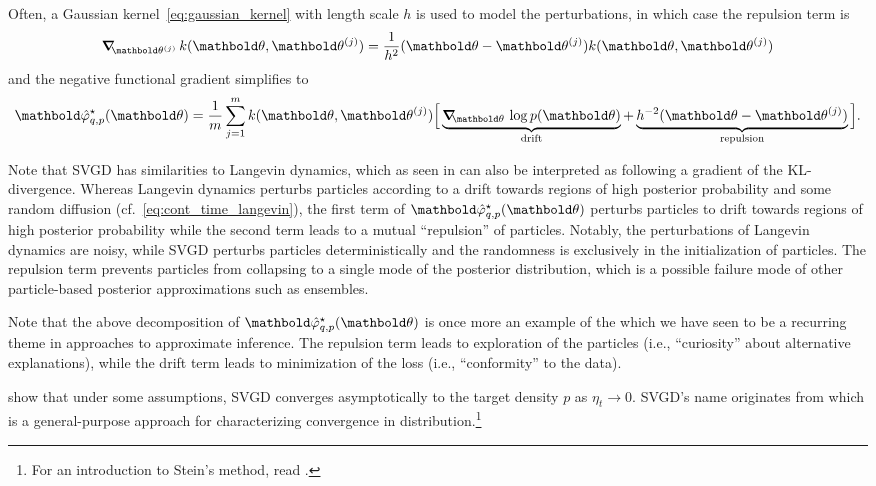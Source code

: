 Often, a Gaussian kernel~\eqref{eq:gaussian_kernel} with length scale $h$ is used to model the perturbations, in which case the repulsion term is \begin{align}
  \grad_{\vtheta^{(j)}} k(\vtheta,\vtheta^{(j)}) = \frac{1}{h^2} (\vtheta - \vtheta^{(j)}) k(\vtheta,\vtheta^{(j)})
\end{align} and the negative functional gradient simplifies to \begin{align}
  \opt{\vvarphihat_{q,p}}(\vtheta) = \frac{1}{m} \sum_{j=1}^m k(\vtheta,\vtheta^{(j)}) \Big[ \underbrace{\grad_{\vtheta} \log p(\vtheta)}_{\text{drift}} + \underbrace{h^{-2} (\vtheta - \vtheta^{(j)})}_{\text{repulsion}} \Big].
\end{align}

Note that SVGD has similarities to Langevin dynamics, which as seen in  can also be interpreted as following a gradient of the KL-divergence.
Whereas Langevin dynamics perturbs particles according to a drift towards regions of high posterior probability and some random diffusion (cf.~\cref{eq:cont_time_langevin}), the first term of $\opt{\vvarphihat_{q,p}}(\vtheta)$ perturbs particles to drift towards regions of high posterior probability while the second term leads to a mutual ``repulsion'' of particles.
Notably, the perturbations of Langevin dynamics are noisy, while SVGD perturbs particles deterministically and the randomness is exclusively in the initialization of particles.
The repulsion term prevents particles from collapsing to a single mode of the posterior distribution, which is a possible failure mode of other particle-based posterior approximations such as ensembles.

Note that the above decomposition of $\opt{\vvarphihat_{q,p}}(\vtheta)$ is once more an example of the  which we have seen to be a recurring theme in approaches to approximate inference.
The repulsion term leads to exploration of the particles (i.e., ``curiosity'' about alternative explanations), while the drift term leads to minimization of the loss (i.e., ``conformity'' to the data).

\cite{lu2019scaling} show that under some assumptions, SVGD converges asymptotically to the target density $p$ as $\eta_t \to 0$.
SVGD's name originates from  which is a general-purpose approach for characterizing convergence in distribution.\footnote{For an introduction to Stein's method, read .}




